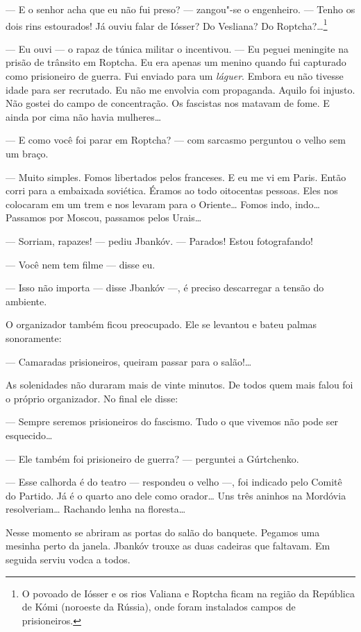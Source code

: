 --- E o senhor acha que eu não fui preso? --- zangou"-se o engenheiro. --- Tenho os dois rins estourados! Já ouviu falar de Iósser?
Do Vesliana? Do Roptcha?\ldots{}\footnote{O povoado de Iósser e os rios
  Valiana e Roptcha ficam na região da República de Kómi (noroeste da
  Rússia), onde foram instalados campos de prisioneiros.}

--- Eu ouvi --- o rapaz de túnica militar o incentivou. --- Eu peguei
meningite na prisão de trânsito em Roptcha. Eu era apenas um menino
quando fui capturado como prisioneiro de guerra. Fui enviado para um
\emph{láguer}. Embora eu não tivesse idade para ser recrutado. Eu não me
envolvia com propaganda. Aquilo foi injusto. Não gostei do campo de
concentração. Os fascistas nos matavam de fome. E ainda por cima não
havia mulheres\ldots{}

--- E como você foi parar em Roptcha? --- com sarcasmo perguntou o velho
sem um braço.

--- Muito simples. Fomos libertados pelos franceses. E eu me vi em
Paris. Então corri para a embaixada soviética. Éramos ao todo oitocentas
pessoas. Eles nos colocaram em um trem e nos levaram para o Oriente\ldots{}
Fomos indo, indo\ldots{} Passamos por Moscou, passamos pelos Urais\ldots{}

--- Sorriam, rapazes! --- pediu Jbankóv. --- Parados! Estou
fotografando!

--- Você nem tem filme --- disse eu.

--- Isso não importa --- disse Jbankóv ---, é preciso descarregar a
tensão do ambiente.

O organizador também ficou preocupado. Ele se levantou e bateu palmas
sonoramente:

--- Camaradas prisioneiros, queiram passar para o salão!\ldots{}

As solenidades não duraram mais de vinte minutos. De todos quem mais
falou foi o próprio organizador. No final ele disse:

--- Sempre seremos prisioneiros do fascismo. Tudo o que vivemos não pode
ser esquecido\ldots{}

--- Ele também foi prisioneiro de guerra? --- perguntei a Gúrtchenko.

--- Esse calhorda é do teatro --- respondeu o velho ---, foi indicado
pelo Comitê do Partido. Já é o quarto ano dele como orador\ldots{} Uns três
aninhos na Mordóvia resolveriam\ldots{} Rachando lenha na floresta\ldots{}

Nesse momento se abriram as portas do salão do banquete. Pegamos uma
mesinha perto da janela. Jbankóv trouxe as duas cadeiras que faltavam.
Em seguida serviu vodca a todos.

